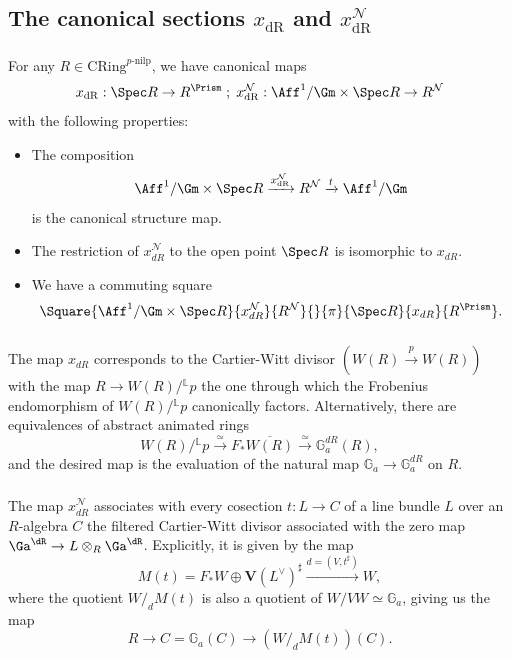 \documentclass[10pt]{amsart}
\begin{document}
\subsection{The canonical sections $x_{\mathrm{dR}}$ and $x_{\mathrm{dR}}^{\mathcal{N}}$}
\label{subsec:can_sections}

\subsubsection{}
For any $R\in \mathrm{CRing}^{p\text{-nilp}}$, we have canonical maps
\[
x_{\mathrm{dR}}:\Spec R \to R^{\Prism}\;;\; x_{\mathrm{dR}}^{\mathcal{N}}:\Aff^1/\Gm\times\Spec R \to R^{\mathcal{N}}
\]
with the following properties:
\begin{itemize}
   \item The composition
   \[
    \Aff^1/\Gm \times \Spec R\xrightarrow{x_{\mathrm{dR}}^{\mathcal{N}}} R^{\mathcal{N}}\xrightarrow{t}\Aff^1/\Gm
   \]
   is the canonical structure map.
   \item The restriction of $x_{dR}^{\mathcal{N}}$ to the open point $\Spec R$ is isomorphic to $x_{dR}$.

   \item We have a commuting square
   \[
    \Square{\Aff^1/\Gm\times \Spec R}{x^{\mathcal{N}}_{dR}}{R^{\mathcal{N}}}{}{\pi}{\Spec R}{x_{dR}}{R^\Prism}.
   \]
\end{itemize}

\subsubsection{}
The map $x_{dR}$ corresponds to the Cartier-Witt divisor $(W(R)\xrightarrow{p}W(R))$ with the map $R\to W(R)/{}^{\mathbb{L}}p$ the one through which the Frobenius endomorphism of $W(R)/{}^{\mathbb{L}}p$ canonically factors. Alternatively, there are equivalences of abstract animated rings 
\[
W(R)/{}^{\mathbb{L}}p \xrightarrow{\simeq}F_*\overline{W(R)} \xrightarrow{\simeq}\mathbb{G}_a^{dR}(R),
\]
and the desired map is the evaluation of the natural map $\mathbb{G}_a\to \mathbb{G}_a^{dR}$ on $R$.


\subsubsection{}
The map $x_{dR}^{\mathcal{N}}$ associates with every cosection $t:L\to C$ of a line bundle $L$ over an $R$-algebra $C$ the filtered Cartier-Witt divisor associated with the zero map $\Ga^{\dR}\to L\otimes_R\Ga^{\dR}$. Explicitly, it is given by the map
\[
M(t) = F_*W\oplus \mathbf{V}(L^\vee)^\sharp\xrightarrow{d=(V,t^\sharp)}W,
\]
where the quotient $W/_d M(t)$ is also a quotient of $W/VW \simeq \mathbb{G}_a$, giving us the map
\[
R \to C = \mathbb{G}_a(C)\to (W/_d M(t))(C).
\]
\end{document}
